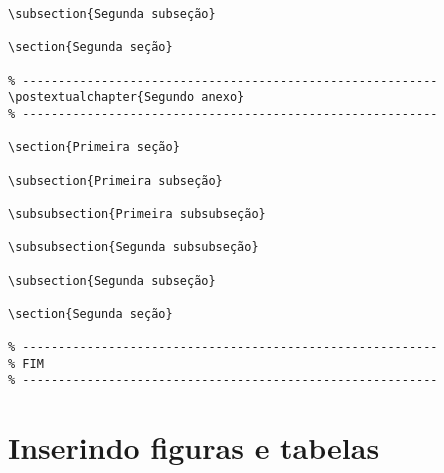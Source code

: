 \documentclass[a4paper,12pt,oneside,onecolumn]{article}
\begin{document}
\begin{verbatim}
\subsection{Segunda subseção}

\section{Segunda seção}

% ----------------------------------------------------------
\postextualchapter{Segundo anexo}
% ----------------------------------------------------------

\section{Primeira seção}

\subsection{Primeira subseção}

\subsubsection{Primeira subsubseção}

\subsubsection{Segunda subsubseção}

\subsection{Segunda subseção}

\section{Segunda seção}

% ----------------------------------------------------------
% FIM
% ----------------------------------------------------------
\end{verbatim}

\section{Inserindo figuras e tabelas}
\end{document}
